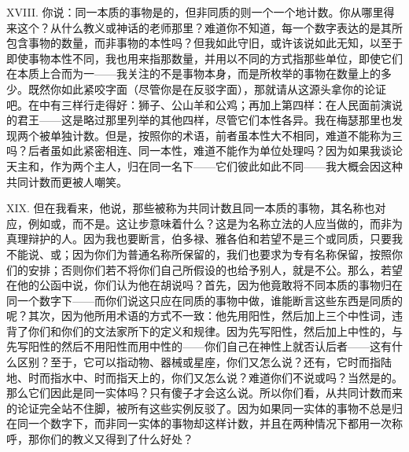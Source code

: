 XVIII. 你说：同一本质的事物是的，但非同质的则一个一个地计数。你从哪里得来这个？从什么教义或神话的老师那里？难道你不知道，每一个数字表达的是其所包含事物的数量，而非事物的本性吗？但我如此守旧，或许该说如此无知，以至于即使事物本性不同，我也用来指那数量，并用以不同的方式指那些单位，即使它们在本质上合而为一——我关注的不是事物本身，而是所枚举的事物在数量上的多少。既然你如此紧咬字面（尽管你是在反驳字面），那就请从这源头拿你的论证吧。在中有三样行走得好：狮子、公山羊和公鸡；再加上第四样：在人民面前演说的君王——这是略过那里列举的其他四样，尽管它们本性各异。我在梅瑟那里也发现两个被单独计数。但是，按照你的术语，前者虽本性大不相同，难道不能称为三吗？后者虽如此紧密相连、同一本性，难道不能作为单位处理吗？因为如果我谈论天主和，作为两个主人，归在同一名下——它们彼此如此不同——我大概会因这种共同计数而更被人嘲笑。\par

XIX. 但在我看来，他说，那些被称为共同计数且同一本质的事物，其名称也对应，例如或，而不是。这让步意味着什么？这是为名称立法的人应当做的，而非为真理辩护的人。因为我也要断言，伯多禄、雅各伯和若望不是三个或同质，只要我不能说、或；因为你们为普通名称所保留的，我们也要求为专有名称保留，按照你们的安排；否则你们若不将你们自己所假设的也给予别人，就是不公。那么，若望在他的公函中说，你们认为他在胡说吗？首先，因为他竟敢将不同本质的事物归在同一个数字下——而你们说这只应在同质的事物中做，谁能断言这些东西是同质的呢？其次，因为他所用术语的方式不一致：他先用阳性，然后加上三个中性词，违背了你们和你们的文法家所下的定义和规律。因为先写阳性，然后加上中性的，与先写阳性的然后不用阳性而用中性的——你们自己在神性上就否认后者——这有什么区别？至于，它可以指动物、器械或星座，你们又怎么说？还有，它时而指陆地、时而指水中、时而指天上的，你们又怎么说？难道你们不说或吗？当然是的。那么它们因此是同一实体吗？只有傻子才会这么说。所以你们看，从共同计数而来的论证完全站不住脚，被所有这些实例反驳了。因为如果同一实体的事物不总是归在同一个数字下，而非同一实体的事物却这样计数，并且在两种情况下都用一次称呼，那你们的教义又得到了什么好处？\par

